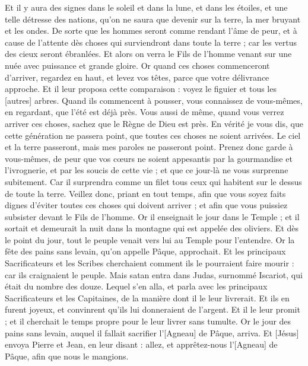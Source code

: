 \begin{multicols}{2}
Et il y aura des signes dans le soleil et dans la lune, et dans les étoiles, et une telle détresse des nations, qu'on ne saura que devenir sur la terre, la mer bruyant et les ondes.
De sorte que les hommes seront comme rendant l'âme de peur, et à cause de l'attente dès choses qui surviendront dans toute la terre ; car les vertus des cieux seront ébranlées.
Et alors on verra le Fils de l'homme venant sur une nuée avec puissance et grande gloire.
Or quand ces choses commenceront d'arriver, regardez en haut, et levez vos têtes, parce que votre délivrance approche.
Et il leur proposa cette comparaison : voyez le figuier et tous les [autres] arbres.
Quand ils commencent à pousser, vous connaissez de vous-mêmes, en regardant, que l'été est déjà près.
Vous aussi de même, quand vous verrez arriver ces choses, sachez que le Règne de Dieu est près.
En vérité je vous dis, que cette génération ne passera point, que toutes ces choses ne soient arrivées.
Le ciel et la terre passeront, mais mes paroles ne passeront point.
Prenez donc garde à vous-mêmes, de peur que vos cœurs ne soient appesantis par la gourmandise et l'ivrognerie, et par les soucis de cette vie ; et que ce jour-là ne vous surprenne subitement.
Car il surprendra comme un filet tous ceux qui habitent sur le dessus de toute la terre.
Veillez donc, priant en tout temps, afin que vous soyez faits dignes d'éviter toutes ces choses qui doivent arriver ; et afin que vous puissiez subsister devant le Fils de l'homme.
Or il enseignait le jour dans le Temple ; et il sortait et demeurait la nuit dans la montagne qui est appelée des oliviers.
Et dès le point du jour, tout le peuple venait vers lui au Temple pour l'entendre.
\VerseOne{}Or la fête des pains sans levain, qu'on appelle Pâque, approchait.
Et les principaux Sacrificateurs et les Scribes cherchaient comment ils le pourraient faire mourir : car ils craignaient le peuple.
Mais satan entra dans Judas, surnommé Iscariot, qui était du nombre des douze.
Lequel s'en alla, et parla avec les principaux Sacrificateurs et les Capitaines, de la manière dont il le leur livrerait.
Et ils en furent joyeux, et convinrent qu'ils lui donneraient de l'argent.
Et il le leur promit ; et il cherchait le temps propre pour le leur livrer sans tumulte.
Or le jour des pains sans levain, auquel il fallait sacrifier l'[Agneau] de Pâque, arriva.
Et [Jésus] envoya Pierre et Jean, en leur disant : allez, et apprêtez-nous l'[Agneau] de Pâque, afin que nous le mangions.

\end{multicols}
